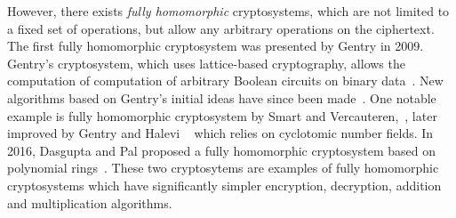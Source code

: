 However, there exists \textit{fully homomorphic} cryptosystems, which are not limited to a fixed set of operations, but allow any arbitrary operations on the ciphertext. The first  fully homomorphic cryptosystem was presented by Gentry in 2009. Gentry's cryptosystem, which uses lattice-based cryptography, allows the computation of computation of arbitrary Boolean circuits on binary data~\cite{gentry_fully_2009, shortell_secure_2016}. New algorithms based on Gentry's initial ideas have since been made~\cite{ sen_homomorphic_2013}. One notable example is fully homomorphic cryptosystem by Smart and Vercauteren,~\cite{hutchison_fully_2010}, later improved by Gentry and Halevi ~\cite{hutchison_implementing_2011} which relies on cyclotomic number fields. In 2016, Dasgupta and Pal proposed a fully homomorphic cryptosystem based on polynomial rings~\cite{dasgupta_design_2016}. These two cryptosytems are examples of fully homomorphic cryptosystems which have significantly simpler encryption, decryption, addition and multiplication algorithms.
